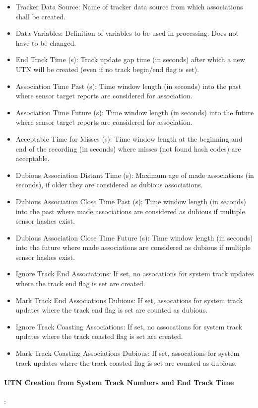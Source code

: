 \begin{itemize}  
\item Tracker Data Source: Name of tracker data source from which associations shall be created.
\item Data Variables: Definition of variables to be used in processing. Does not have to be changed.
\item End Track Time (s): Track update gap time (in seconds) after which a new UTN will be created (even if no track begin/end flag is set).
\item Association Time Past (s): Time window length (in seconds) into the past where sensor target reports are considered for association.
\item Association Time Future (s): Time window length (in seconds) into the future where sensor target reports are considered for association.
\item Acceptable Time for Misses (s): Time window length at the beginning and end of the recording (in seconds) where misses (not found hash codes) are acceptable.
\item Dubious Association Distant Time (s): Maximum age of made associations (in seconds), if older they are considered as dubious associations.
\item Dubious Association Close Time Past (s): Time window length (in seconds) into the past where made associations are considered as dubious if multiple sensor hashes exist.
\item Dubious Association Close Time Future (s): Time window length (in seconds) into the future where made associations are considered as dubious if multiple sensor hashes exist.
\item Ignore Track End Associations: If set, no assocations for system track updates where the track end flag is set are created.
\item Mark Track End Associations Dubious: If set, assocations for system track updates where the track end flag is set are counted as dubious.
\item Ignore Track Coasting Associations: If set, no assocations for system track updates where the track coasted flag is set are created.
\item Mark Track Coasting Associations Dubious: If set, assocations for system track updates where the track coasted flag is set are counted as dubious.
\end{itemize}

\paragraph{UTN Creation from System Track Numbers and End Track Time}: 

